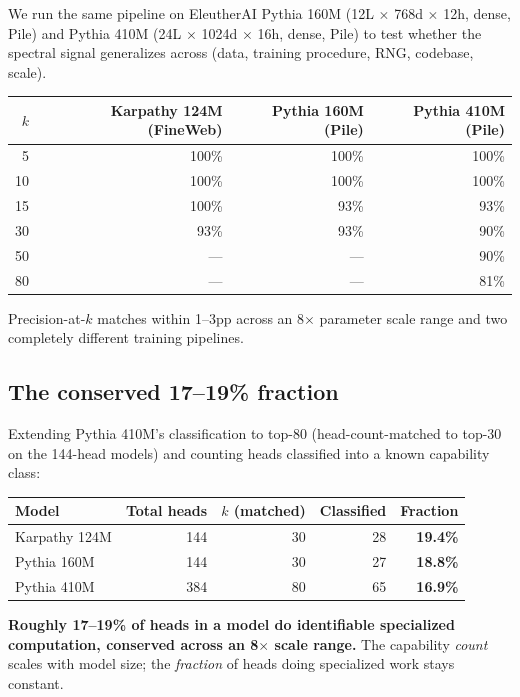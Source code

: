 \documentclass[11pt]{article}
\begin{document}
We run the same pipeline on EleutherAI Pythia 160M (12L $\times$ 768d $\times$ 12h, dense, Pile) and Pythia 410M (24L $\times$ 1024d $\times$ 16h, dense, Pile) to test whether the spectral signal generalizes across (data, training procedure, RNG, codebase, scale).

\begin{center}
\small
\begin{tabular}{rrrr}
\toprule
$k$ & Karpathy 124M (FineWeb) & Pythia 160M (Pile) & Pythia 410M (Pile) \\
\midrule
5  & 100\% & 100\% & 100\% \\
10 & 100\% & 100\% & 100\% \\
15 & 100\% & 93\%  & 93\% \\
30 & 93\%  & 93\%  & 90\% \\
50 & ---   & ---   & 90\% \\
80 & ---   & ---   & 81\% \\
\bottomrule
\end{tabular}
\end{center}

Precision-at-$k$ matches within 1--3pp across an 8$\times$ parameter scale range and two completely different training pipelines.

\subsection{The conserved 17--19\% fraction}
\label{sec:conserved_fraction}

Extending Pythia 410M's classification to top-80 (head-count-matched to top-30 on the 144-head models) and counting heads classified into a known capability class:

\begin{center}
\small
\begin{tabular}{lrrrr}
\toprule
Model & Total heads & $k$ (matched) & Classified & Fraction \\
\midrule
Karpathy 124M & 144 & 30 & 28 & \textbf{19.4\%} \\
Pythia 160M   & 144 & 30 & 27 & \textbf{18.8\%} \\
Pythia 410M   & 384 & 80 & 65 & \textbf{16.9\%} \\
\bottomrule
\end{tabular}
\end{center}

\textbf{Roughly 17--19\% of heads in a model do identifiable specialized computation, conserved across an 8$\times$ scale range.} The capability \emph{count} scales with model size; the \emph{fraction} of heads doing specialized work stays constant.
\end{document}
